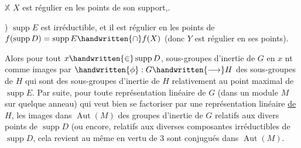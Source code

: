 
$\mathbb{X}$  $X$ est régulier en les points de son support\handwritten{)},.

) $\operatorname{supp}E$ est irréductible, et il est régulier en les points de $f(\operatorname{supp}D)=\operatorname{supp}E\handwritten{\cap}f(X)$ (donc $Y$ est régulier en ses points).

Alors pour tout $x\handwritten{\in}\operatorname{supp}D$,  sous-groupes d'inertie de $G$ en $x$ nt comme images par $\handwritten{\phi}:G\handwritten{\longrightarrow}H$ des sous-groupes de $H$ qui sont des sous-groupes d'inertie de $H$ relativement au point maximal de $\operatorname{supp}E$. Par suite, pour toute représentation linéaire de $G$ (dans un module $M$ sur quelque anneau)  qui veut bien se factoriser par une représentation linéaire \uline{de} $H$, les images dans $\operatorname{Aut}(M)$ des groupes d'inertie  de $G$ relatifs aux divers points de $\operatorname{supp}D$ (ou encore, relatifs aux diverses composantes irréductibles de $\operatorname{supp}D$, cela revient au même en vertu de 3\handwritten{)} sont conjugués dans $\operatorname{Aut}(M)$.

